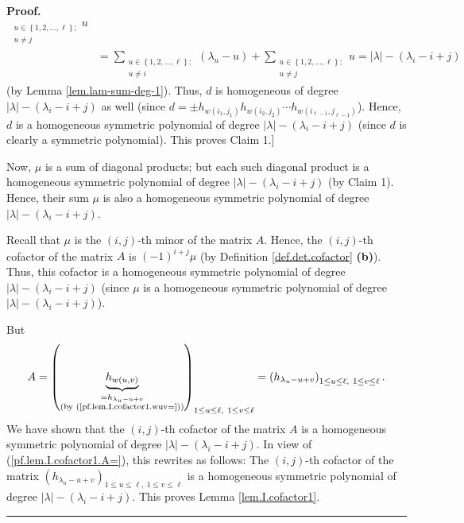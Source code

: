 \documentclass[numbers=enddot,12pt,final,onecolumn,notitlepage]{scrartcl}%
\theoremstyle{definition}
\newenvironment{proof}[1][Proof]{\noindent\textbf{#1.} }{\ \rule{0.5em}{0.5em}}
\let\sumnonlimits\sum
\renewcommand{\sum}{\sumnonlimits\limits}
\begin{document}
\begin{proof}
\begin{align*}
{_{\substack{u\in\left\{  1,2,\ldots,\ell\right\}  ;\\u\neq j}}}u\\
&  =\sum_{\substack{u\in\left\{  1,2,\ldots,\ell\right\}  ;\\u\neq i}}\left(
\lambda_{u}-u\right)  +\sum_{\substack{u\in\left\{  1,2,\ldots,\ell\right\}
;\\u\neq j}}u=\left\vert \lambda\right\vert -\left(  \lambda_{i}-i+j\right)
\end{align*}
(by Lemma \ref{lem.lam-sum-deg-1}). Thus, $d$ is homogeneous of degree
$\left\vert \lambda\right\vert -\left(  \lambda_{i}-i+j\right)  $ as well
(since $d=\pm h_{w\left(  i_{1},j_{1}\right)  }h_{w\left(  i_{2},j_{2}\right)
}\cdots h_{w\left(  i_{\ell-1},j_{\ell-1}\right)  }$). Hence, $d$ is a
homogeneous symmetric polynomial of degree $\left\vert \lambda\right\vert
-\left(  \lambda_{i}-i+j\right)  $ (since $d$ is clearly a symmetric
polynomial). This proves Claim 1.]

Now, $\mu$ is a sum of diagonal products; but each such diagonal product is a
homogeneous symmetric polynomial of degree $\left\vert \lambda\right\vert
-\left(  \lambda_{i}-i+j\right)  $ (by Claim 1). Hence, their sum $\mu$ is
also a homogeneous symmetric polynomial of degree $\left\vert \lambda
\right\vert -\left(  \lambda_{i}-i+j\right)  $.

Recall that $\mu$ is the $\left(  i,j\right)  $-th minor of the matrix $A$.
Hence, the $\left(  i,j\right)  $-th cofactor of the matrix $A$ is $\left(
-1\right)  ^{i+j}\mu$ (by Definition \ref{def.det.cofactor} \textbf{(b)}).
Thus, this cofactor is a homogeneous symmetric polynomial of degree
$\left\vert \lambda\right\vert -\left(  \lambda_{i}-i+j\right)  $ (since $\mu$
is a homogeneous symmetric polynomial of degree $\left\vert \lambda\right\vert
-\left(  \lambda_{i}-i+j\right)  $).

But
\begin{equation}
A=\left(  \underbrace{h_{w\left(  u,v\right)  }}_{\substack{=h_{\lambda
_{u}-u+v}\\\text{(by (\ref{pf.lem.I.cofactor1.wuv=}))}}}\right)  _{1\leq
u\leq\ell,\ 1\leq v\leq\ell}=\left(  h_{\lambda_{u}-u+v}\right)  _{1\leq
u\leq\ell,\ 1\leq v\leq\ell}. \label{pf.lem.I.cofactor1.A=}%
\end{equation}
We have shown that the $\left(  i,j\right)  $-th cofactor of the matrix $A$ is
a homogeneous symmetric polynomial of degree $\left\vert \lambda\right\vert
-\left(  \lambda_{i}-i+j\right)  $. In view of (\ref{pf.lem.I.cofactor1.A=}),
this rewrites as follows: The $\left(  i,j\right)  $-th cofactor of the matrix
$\left(  h_{\lambda_{u}-u+v}\right)  _{1\leq u\leq\ell,\ 1\leq v\leq\ell}$ is
a homogeneous symmetric polynomial of degree $\left\vert \lambda\right\vert
-\left(  \lambda_{i}-i+j\right)  $. This proves Lemma \ref{lem.I.cofactor1}.
\end{proof}
\end{document}
